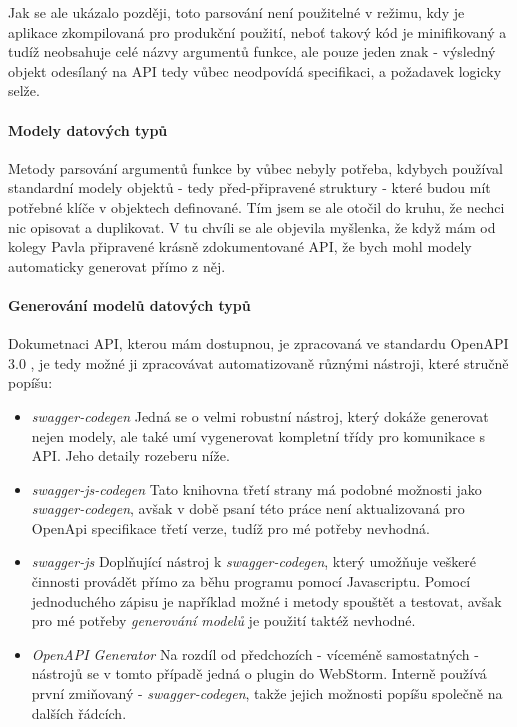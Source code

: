 Jak se ale ukázalo později, toto parsování není použitelné v režimu, kdy je aplikace zkompilovaná pro produkční použití, neboť takový kód je minifikovaný a tudíž neobsahuje celé názvy argumentů funkce, ale pouze jeden znak - výsledný objekt odesílaný na API tedy vůbec neodpovídá specifikaci, a požadavek logicky selže.

\paragraph{Modely datových typů} Metody parsování argumentů funkce by vůbec nebyly potřeba, kdybych používal standardní modely objektů - tedy před-připravené struktury - které budou mít potřebné klíče v objektech definované. Tím jsem se ale otočil do kruhu, že nechci nic opisovat a duplikovat. V tu chvíli se ale objevila myšlenka, že když mám od kolegy Pavla připravené krásně zdokumentované API, že bych mohl modely automaticky generovat přímo z něj.

\paragraph{Generování modelů datových typů} Dokumetnaci API, kterou mám dostupnou, je zpracovaná ve standardu OpenAPI 3.0 \cite{openapi-spec}, je tedy možné ji zpracovávat automatizovaně různými nástroji, které stručně popíšu:

\begin{itemize}
    \item \emph{swagger-codegen} \cite{swagger-codegen} Jedná se o velmi robustní nástroj, který dokáže generovat nejen modely, ale také umí vygenerovat kompletní třídy pro komunikace s API. Jeho detaily rozeberu níže.
    \item \emph{swagger-js-codegen} \cite{swagger-js-codegen} Tato knihovna třetí strany má podobné možnosti jako \emph{swagger-codegen}, avšak v době psaní této práce není aktualizovaná pro OpenApi specifikace třetí verze, tudíž pro mé potřeby nevhodná.
    \item \emph{swagger-js} \cite{swagger-js} Doplňující nástroj k \emph{swagger-codegen}, který umožňuje veškeré činnosti provádět přímo za běhu programu pomocí Javascriptu. Pomocí jednoduchého zápisu je například možné i metody spouštět a testovat, avšak pro mé potřeby \emph{generování modelů} je použití taktéž nevhodné.
    \item \emph{OpenAPI Generator} \cite{openapi-generator} Na rozdíl od předchozích - víceméně samostatných - nástrojů se v tomto případě jedná o plugin do WebStorm. Interně používá první zmiňovaný - \emph{swagger-codegen}, takže jejich možnosti popíšu společně na dalších řádcích.
\end{itemize}

